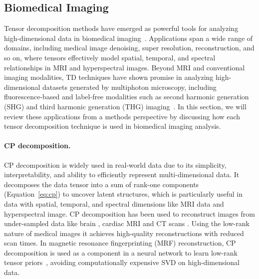 \subsection{Biomedical Imaging}\label{sec:td_imaging}

Tensor decomposition methods have emerged as powerful tools for analyzing high-dimensional data in biomedical imaging~\cite{sedighin2024tensor}.
Applications span a wide range of domains, including medical image denoising, super resolution, reconstruction, and so on, where tensors effectively model spatial, temporal, and spectral relationships in MRI and hyperspectral images. Beyond MRI and conventional imaging modalities, TD techniques have shown promise in analyzing high-dimensional datasets generated by multiphoton microscopy, including fluorescence-based and label-free modalities such as second harmonic generation (SHG) and third harmonic generation (THG) imaging~\cite{jamesdarian2021recent}.  In this section, we will review these applications from a methods perspective by discussing how each tensor decomposition technique is used in biomedical imaging analysis. 

\paragraph{CP decomposition.} CP decomposition is widely used in real-world data due to its simplicity, interpretability, and ability to efficiently represent multi-dimensional data. It decomposes the data tensor into a sum of rank-one components (Equation~\ref{eq:cp}) to uncover latent structures, which is particularly useful in data with spatial, temporal, and spectral dimensions like MRI data and hyperspectral image. CP decomposition has been used to reconstruct images from under-sampled data like brain \cite{li2023learned, hou2020matrix}, cardiac \cite{wu2018multiple} MRI and CT scans \cite{zhang2016tensor}. Using the low-rank nature of medical images it achieves high-quality reconstructions with reduced scan times. In magnetic resonance fingerprinting (MRF) reconstruction, CP decomposition is used as a component in a neural network to learn low-rank tensor priors~\cite{li2023learned}, avoiding computationally expensive SVD on high-dimensional data.  

